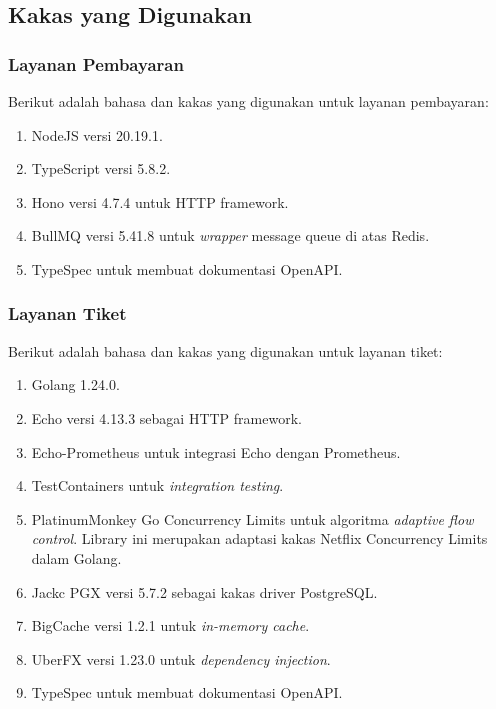 \subsection{Kakas yang Digunakan}

\subsubsection{Layanan Pembayaran}

Berikut adalah bahasa dan kakas yang digunakan untuk layanan pembayaran:

\begin{enumerate}
    \item NodeJS versi 20.19.1.
    \item TypeScript versi 5.8.2.
    \item Hono versi 4.7.4 untuk HTTP framework.
    \item BullMQ versi 5.41.8 untuk \textit{wrapper} message queue di atas Redis.
    \item TypeSpec untuk membuat dokumentasi OpenAPI.
\end{enumerate}

\subsubsection{Layanan Tiket}

Berikut adalah bahasa dan kakas yang digunakan untuk layanan tiket:

\begin{enumerate}
    \item Golang 1.24.0.
    \item Echo versi 4.13.3 sebagai HTTP framework.
    \item Echo-Prometheus untuk integrasi Echo dengan Prometheus.
    \item TestContainers untuk \textit{integration testing}.
    \item PlatinumMonkey Go Concurrency Limits untuk algoritma \textit{adaptive flow control}. Library ini merupakan adaptasi kakas Netflix Concurrency Limits dalam Golang.
    \item Jackc PGX versi 5.7.2 sebagai kakas driver PostgreSQL.
    \item BigCache versi 1.2.1 untuk \textit{in-memory cache}.
    \item UberFX versi 1.23.0 untuk \textit{dependency injection}.
    \item TypeSpec untuk membuat dokumentasi OpenAPI.
\end{enumerate}

